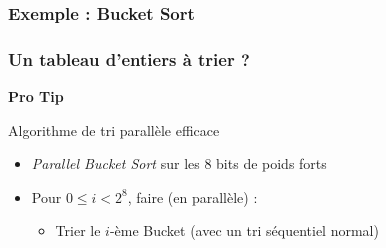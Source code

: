 \documentclass[xcolor={x11names,svgnames}]{beamer}
\begin{document}
  
  
\begin{frame}[label=radix_curve]
  \frametitle{Exemple : Bucket Sort}

\end{frame}


\begin{frame}[label=radix_code]
  \frametitle{Un tableau d'entiers à trier ?}
  
    \begin{center}
      \Huge \bf \alert{Pro Tip}
  \end{center}

  \begin{exampleblock}{Algorithme de tri parallèle efficace}
    \begin{itemize}
  \item \emph{Parallel Bucket Sort} sur les 8 bits de poids forts
  \item Pour $0 \leq i < 2^8$, faire (en parallèle) :
    \begin{itemize}
    \item Trier le $i$-ème Bucket (avec un tri séquentiel normal)
    \end{itemize}
  \end{itemize}
\end{exampleblock}
  
\end{frame}
\end{document}
